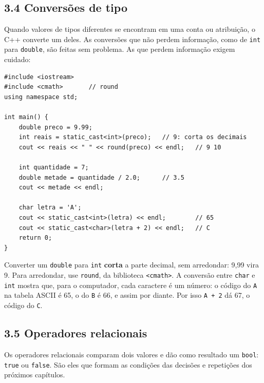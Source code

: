 \subsection{3.4 Conversões de tipo}

Quando valores de tipos diferentes se encontram em uma conta ou atribuição, o C++ converte um deles. As conversões que não perdem informação, como de \texttt{int} para \texttt{double}, são feitas sem problema. As que perdem informação exigem cuidado:

\begin{codigo}
\begin{Verbatim}[breaklines=true, breaksymbolleft={}, fontsize=\footnotesize]
#include <iostream>
#include <cmath>       // round
using namespace std;

int main() {
    double preco = 9.99;
    int reais = static_cast<int>(preco);   // 9: corta os decimais
    cout << reais << " " << round(preco) << endl;   // 9 10

    int quantidade = 7;
    double metade = quantidade / 2.0;      // 3.5
    cout << metade << endl;

    char letra = 'A';
    cout << static_cast<int>(letra) << endl;        // 65
    cout << static_cast<char>(letra + 2) << endl;   // C
    return 0;
}
\end{Verbatim}
\end{codigo}

Converter um \texttt{double} para \texttt{int} \textbf{corta} a parte decimal, sem arredondar: 9,99 vira 9. Para arredondar, use \texttt{round}, da biblioteca \texttt{<cmath>}. A conversão entre \texttt{char} e \texttt{int} mostra que, para o computador, cada caractere é um número: o código do \texttt{\textquotesingle{}A\textquotesingle{}} na tabela ASCII é 65, o do \texttt{\textquotesingle{}B\textquotesingle{}} é 66, e assim por diante. Por isso \texttt{\textquotesingle{}A\textquotesingle{} + 2} dá 67, o código do \texttt{\textquotesingle{}C\textquotesingle{}}.

\subsection{3.5 Operadores relacionais}

Os operadores relacionais comparam dois valores e dão como resultado um \texttt{bool}: \texttt{true} ou \texttt{false}. São eles que formam as condições das decisões e repetições dos próximos capítulos.

